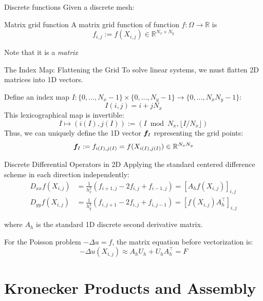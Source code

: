 \documentclass[aspectratio=169]{beamer}
\renewcommand{\vec}{\vectorsym}
\begin{document}
\begin{frame}{Discrete functions}
    Given a discrete mesh: 
    \begin{block}{Matrix grid function}
    A matrix grid function of function $f: \Omega \to \mathbb{R}$ is
        $$f_{i,j} := f(X_{i,j}) \in \mathbb{R}^{N_x \times N_y}$$
    \end{block}

    \alert{Note that it is a \emph{matrix}}

\end{frame}

\begin{frame}{The Index Map: Flattening the Grid}
    To solve linear systems, we must flatten 2D matrices into 1D vectors.

    Define an index map $I: \{0, \dots, N_x-1\} \times \{0, \dots, N_y-1\} \to \{0, \dots, N_x N_y - 1\}$:
    \[
        I(i, j) = i + j N_x
    \]
    \pause This lexicographical map is invertible:
    \[
        I \mapsto (i(I), j(I)) := (I \bmod N_x, \lfloor I / N_x \rfloor)
    \]
    \pause Thus, we can uniquely define the 1D vector $\vec{f}_I$ representing the grid points:
    \[
        \vec f_I := f_{i(I), j(I)} = f(X_{i(I), j(I)}) \in \mathbb{R}^{N_x N_y}
    \]
\end{frame}

\begin{frame}{Discrete Differential Operators in 2D}
    Applying the standard centered difference scheme in each direction independently:
    \begin{align*}
        D_{xx} f(X_{i,j}) &= \frac{1}{h_x^2} \left( f_{i+1,j} - 2 f_{i,j} + f_{i-1,j} \right) = [A_h f(X_{i,j})]_{i,j} \\
        D_{yy} f(X_{i,j}) &= \frac{1}{h_y^2} \left( f_{i,j+1} - 2 f_{i,j} + f_{i,j-1} \right) = [f(X_{i,j}) A_h^\top]_{i,j}
    \end{align*}
    
    where $A_h$ is the standard 1D discrete second derivative matrix. 
    
    \pause
    \begin{example}
    For the Poisson problem $-\Delta u = f$, the matrix equation before vectorization is:
    \[
        -\Delta u(X_{i,j}) \approx A_h U_h + U_h A_h^\top = F
    \]
    \end{example}
\end{frame}

\section{Kronecker Products and Assembly}
\end{document}
